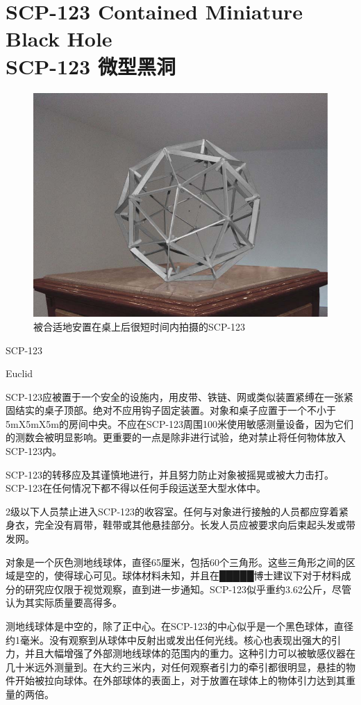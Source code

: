 \chapter[SCP-123 微型黑洞]{
    SCP-123 Contained Miniature Black Hole\\
    SCP-123 微型黑洞
}

\label{chap:SCP-123}

\begin{figure}[H]
    \centering
    \includegraphics[width=0.5\linewidth]{images/SCP.123.jpg}
    \caption*{被合适地安置在桌上后很短时间内拍摄的SCP-123}
\end{figure}

SCP-123

Euclid

SCP-123应被置于一个安全的设施内，用皮带、铁链、网或类似装置紧缚在一张紧固结实的桌子顶部。绝对不应用钩子固定装置。对象和桌子应置于一个不小于5mX5mX5m的房间中央。不应在SCP-123周围100米使用敏感测量设备，因为它们的测数会被明显影响。更重要的一点是除非进行试验，绝对禁止将任何物体放入SCP-123内。

SCP-123的转移应及其谨慎地进行，并且努力防止对象被摇晃或被大力击打。SCP-123在任何情况下都不得以任何手段运送至大型水体中。

2级以下人员禁止进入SCP-123的收容室。任何与对象进行接触的人员都应穿着紧身衣，完全没有肩带，鞋带或其他悬挂部分。长发人员应被要求向后束起头发或带发网。

对象是一个灰色测地线球体，直径65厘米，包括60个三角形。这些三角形之间的区域是空的，使得球心可见。球体材料未知，并且在█████博士建议下对于材料成分的研究应仅限于视觉观察，直到进一步通知。SCP-123似乎重约3.62公斤，尽管认为其实际质量要高得多。

测地线球体是中空的，除了正中心。在SCP-123的中心似乎是一个黑色球体，直径约1毫米。没有观察到从球体中反射出或发出任何光线。核心也表现出强大的引力，并且大幅增强了外部测地线球体的范围内的重力。这种引力可以被敏感仪器在几十米远外测量到。在大约三米内，对任何观察者引力的牵引都很明显，悬挂的物件开始被拉向球体。在外部球体的表面上，对于放置在球体上的物体引力达到其重量的两倍。

